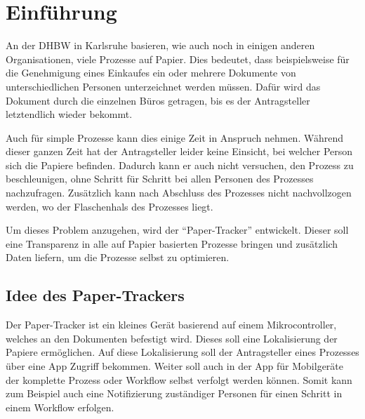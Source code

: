\chapter{Einführung}

An der \gls{DHBW} in Karlsruhe basieren, wie auch noch in einigen anderen Organisationen, viele Prozesse auf Papier.
Dies bedeutet, dass beispielsweise für die Genehmigung eines Einkaufes ein oder mehrere Dokumente von unterschiedlichen Personen unterzeichnet werden müssen.
Dafür wird das Dokument durch die einzelnen Büros getragen, bis es der Antragsteller letztendlich wieder bekommt.

Auch für simple Prozesse kann dies einige Zeit in Anspruch nehmen.
Während dieser ganzen Zeit hat der Antragsteller leider keine Einsicht, bei welcher Person sich die Papiere befinden.
Dadurch kann er auch nicht versuchen, den Prozess zu beschleunigen, ohne Schritt für Schritt bei allen Personen des Prozesses nachzufragen.
Zusätzlich kann nach Abschluss des Prozesses nicht nachvollzogen werden, wo der Flaschenhals des Prozesses liegt.

Um dieses Problem anzugehen, wird der \enquote{Paper-Tracker} entwickelt.
Dieser soll eine Transparenz in alle auf Papier basierten Prozesse bringen und zusätzlich Daten liefern, um die Prozesse selbst zu optimieren.

\section{Idee des Paper-Trackers}

Der Paper-Tracker ist ein kleines Gerät basierend auf einem Mikrocontroller, welches an den Dokumenten befestigt wird.
Dieses soll eine Lokalisierung der Papiere ermöglichen.
Auf diese Lokalisierung soll der Antragsteller eines Prozesses über eine App Zugriff bekommen.
Weiter soll auch in der App für Mobilgeräte der komplette Prozess oder Workflow selbst verfolgt werden können.
Somit kann zum Beispiel auch eine Notifizierung zuständiger Personen für einen Schritt in einem Workflow erfolgen.
